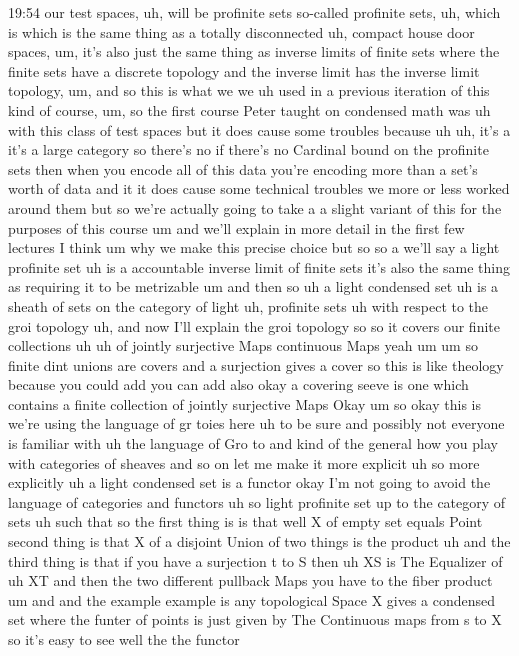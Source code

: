 \begin{unfinished}{19:54}
our test spaces, uh, will be profinite sets so-called profinite sets, uh, which is which is the same thing as a totally disconnected uh, compact house door spaces, um, it's also just the same thing as inverse limits of finite sets where the finite sets have a discrete topology and the inverse limit has the inverse limit topology, um, and so this is what we we uh used in a previous iteration of this kind of course, um, so the first course Peter taught on condensed math was uh with this class of test spaces but it does cause some troubles because uh uh, it's a it's a large category so there's no if there's no Cardinal bound on the profinite sets then when you encode all of this data you're encoding more than a set's worth of data and it it does cause some technical troubles we more or less worked around them but so we're actually going to take a a slight variant of this for the purposes of this course um and we'll explain in more detail in the first few lectures I think um why we make this precise choice but so so a we'll say a light profinite set uh is a accountable inverse limit of finite sets it's also the same thing as requiring it to be metrizable um and then so uh a light condensed set uh is a sheath of sets on the category of light uh, profinite sets uh with respect to the groi topology uh, and now I'll explain the groi topology so so it covers our finite collections uh uh of jointly surjective Maps continuous Maps yeah um um so finite dint unions are covers and a surjection gives a cover so this is like theology because you could add you can add also okay a covering seeve is one which contains a finite collection of jointly surjective Maps Okay um so okay this is we're using the language of gr toies here uh to be sure and possibly not everyone is familiar with uh the language of Gro to and kind of the general how you play with categories of sheaves and so on let me make it more explicit uh so more explicitly uh a light condensed set is a functor okay I'm not going to avoid the language of categories and functors uh so light profinite set up to the category of sets uh such that so the first thing is is that well X of empty set equals Point second thing is that X of a disjoint Union of two things is the product uh and the third thing is that if you have a surjection t to S then uh XS is The Equalizer of uh XT and then the two different pullback Maps you have to the fiber product um and and the example example is any topological Space X gives a condensed set where the funter of points is just given by The Continuous maps from s to X so it's easy to see well the the functor


\end{unfinished}
